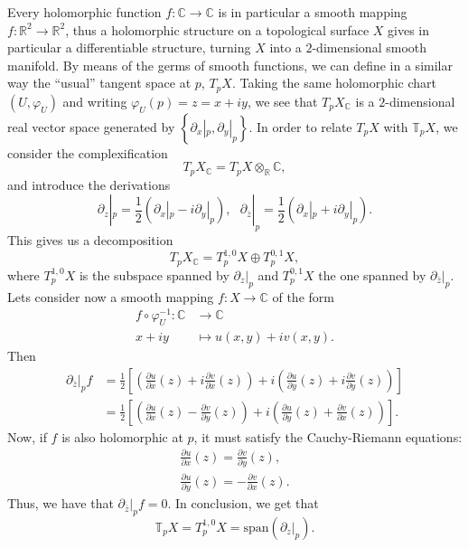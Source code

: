 \documentclass[12pt,a4paper]{book}
\theoremstyle{definition} \newtheorem{defn}[thm]{Definition}
\theoremstyle{definition} \newtheorem{ejemplo}[thm]{Example}
\theoremstyle{definition} \newtheorem{ejercicio}[thm]{Exercise}
\theoremstyle{remark} \newtheorem*{obs}{Remark}
\def\CC{\mathbb{C}}
\def\RR{\mathbb{R}}
\def\TT{\mathbb{T}}
\begin{document}
  Every holomorphic function $f:\CC \rightarrow \CC$ is in particular a smooth mapping $f:\RR^2 \rightarrow \RR^2$, thus a holomorphic structure on a topological surface $X$ gives in particular a differentiable structure, turning $X$ into a $2$-dimensional smooth manifold. By means of the germs of smooth functions, we can define in a similar way the ``usual'' tangent space at $p$, $T_pX$.
  Taking the same holomorphic chart $(U,\varphi_U)$ and writing $\varphi_U(p)=z=x+iy$, we see that $T_pX_{\CC}$ is a $2$-dimensional real vector space generated by $\left\{ \partial_x|_p, \partial_y|_p \right\}$.
  In order to relate $T_pX$ with $\TT_pX$, we consider the complexification
  \begin{equation*}
    T_pX_{\CC} = T_pX \otimes_\RR \CC,
  \end{equation*}
  and introduce the derivations
  \begin{equation*}
    \partial_z|_p = \frac{1}{2}(\partial_x|_p - i \partial_y|_p), \ \ \ \partial_{\bar{z}}|_p=\frac{1}{2}(\partial_x|_p + i \partial_y|_p).
  \end{equation*}
  This gives us a decomposition
  \begin{equation*}
    T_pX_{\CC} = T_p^{1,0}X \oplus T_p^{0,1}X,
  \end{equation*}
  where $T_p^{1,0}X$ is the subspace spanned by $\partial_z|_p$ and $T_p^{0,1}X$ the one spanned by $\partial_{\bar{z}}|_p$. Lets consider now a smooth mapping $f:X\rightarrow \CC$ of the form
  \begin{align*}
    f\circ \varphi^{-1}_U :\CC&\longrightarrow \CC\\ 
      x+iy &\longmapsto u(x,y)+iv(x,y). 
    \end{align*}
    Then 
    \begin{align*}
      \partial_{\bar{z}}|_p f &= \frac{1}{2}\left[ \left(\frac{\partial u}{\partial x}(z)+i\frac{\partial v}{\partial x}(z)\right)+i\left( \frac{\partial u}{\partial y}(z)+i\frac{\partial v}{\partial y}(z)  \right) \right] \\ 
      &=\frac{1}{2}\left[ \left(\frac{\partial u}{\partial x}(z)-\frac{\partial v}{\partial y}(z)\right)+i\left( \frac{\partial u}{\partial y}(z)+\frac{\partial v}{\partial x}(z)  \right) \right].
    \end{align*}
    Now, if $f$ is also holomorphic at $p$, it must satisfy the Cauchy-Riemann equations:
\begin{align*}
    \frac{\partial u}{\partial x}(z)=\frac{\partial v}{\partial y}(z), \\
    \frac{\partial u}{\partial y}(z)=-\frac{\partial v}{\partial x}(z).
\end{align*}
Thus, we have that $\partial_{\bar{z}}|_p f = 0$. In conclusion, we get that
\begin{equation*}
  \TT_p X= T^{1,0}_p X=\mathrm{span}(\partial_z|_p).
\end{equation*}
\end{document}
